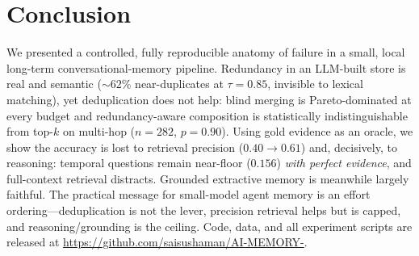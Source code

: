 \section{Conclusion}
\label{sec:conclusion}

We presented a controlled, fully reproducible anatomy of failure in a small,
local long-term conversational-memory pipeline. Redundancy in an LLM-built store
is real and semantic ($\sim\!62\%$ near-duplicates at $\tau{=}0.85$, invisible
to lexical matching), yet deduplication does not help: blind merging is
Pareto-dominated at every budget and redundancy-aware composition is
statistically indistinguishable from top-$k$ on multi-hop ($n{=}282$,
$p{=}0.90$). Using gold evidence as an oracle, we show the accuracy is lost to
retrieval precision ($0.40\!\to\!0.61$) and, decisively, to reasoning: temporal
questions remain near-floor ($0.156$) \emph{with perfect evidence}, and
full-context retrieval distracts. Grounded extractive memory is meanwhile
largely faithful. The practical message for small-model agent memory is an
effort ordering---deduplication is not the lever, precision retrieval helps but
is capped, and reasoning/grounding is the ceiling. Code, data, and all
experiment scripts are released at
\url{https://github.com/saisushaman/AI-MEMORY-}.
